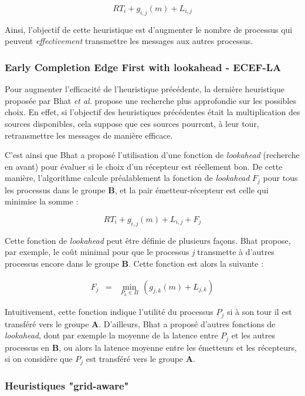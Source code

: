 \[
RT_{i}+g_{i,j}(m)+L_{i,j}\]


Ainsi, l'objectif de cette heuristique est d'augmenter le nombre de
processus qui peuvent \emph{effectivement} transmettre les messages
aux autres processus.


\subsubsection*{Early Completion Edge First with lookahead - ECEF-LA}

Pour augmenter l'efficacité de l'heuristique précédente, la dernière
heuristique proposée par Bhat \emph{et al.} \cite{Bhat03} propose
une recherche plus approfondie sur les possibles choix. En effet,
si l'objectif des heuristiques précédentes était la multiplication
des sources disponibles, cela suppose que ces sources pourront, à
leur tour, retransmettre les messages de manière efficace.

C'est ainsi que Bhat a proposé l'utilisation d'une fonction de \emph{lookahead}
(recherche en avant) pour évaluer si le choix d'un récepteur est réellement
bon. De cette manière, l'algorithme calcule préalablement la fonction
de \emph{lookahead} $F_{j}$ pour tous les processus dans le groupe
\textbf{B}, et la pair émetteur-récepteur est celle qui minimise
la somme :

\[
RT_{i}+g_{i,j}(m)+L_{i,j}+F_{j}\]


Cette fonction de \emph{lookahead} peut être définie de plusieurs
façons. Bhat \cite{Bhat03} propose, par exemple, le coût minimal
pour que le processus \emph{j} transmette à d'autres processus encore
dans le groupe \textbf{B}. Cette fonction est alors la suivante :

\begin{eqnarray*}
	F_{j} & = & \min_{P_{k}\in B}\,(g_{j,k}(m)+L_{j,k})\end{eqnarray*}


Intuitivement, cette fonction indique l'utilité du processus $P_{j}$
si à son tour il est transféré vers le groupe \textbf{A}. D'ailleurs,
Bhat a proposé d'autres fonctions de \emph{lookahead}, dont par exemple
la moyenne de la latence entre $P_{j}$ et les autres processus en
\textbf{B}, ou alors la latence moyenne entre les émetteurs et les
récepteurs, si on considère que $P_{j}$ est transféré vers le groupe
\textbf{A}. 


\subsubsection{Heuristiques "grid-aware"}


